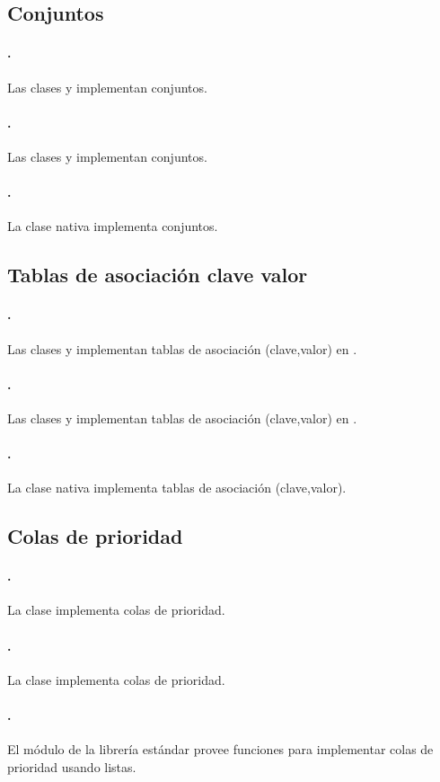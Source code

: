 \subsection{Conjuntos}
\label{tech-set}
\paragraph{\cpp.} Las clases  y  implementan
  conjuntos.
\paragraph{\java.} Las clases  y  implementan
  conjuntos.
\paragraph{\python.} {\new La clase nativa  implementa conjuntos.}

\subsection{Tablas de asociación clave valor}
\label{tech-map}
\paragraph{\cpp.} Las clases  y  implementan tablas de
  asociación (clave,valor) en \cpp.
\paragraph{\java.} Las clases  y  implementan tablas de
  asociación (clave,valor) en \java.
\paragraph{\python.} {\new La clase nativa  implementa tablas de
  asociación (clave,valor).}

\subsection{Colas de prioridad}
\label{tech-priority-queue}
\paragraph{\cpp.} La clase  implementa colas de prioridad.
\paragraph{\java.} La clase  implementa colas de prioridad.
\paragraph{\python.} {\new El módulo  de la librería estándar provee
  funciones para implementar colas de prioridad usando listas.}

